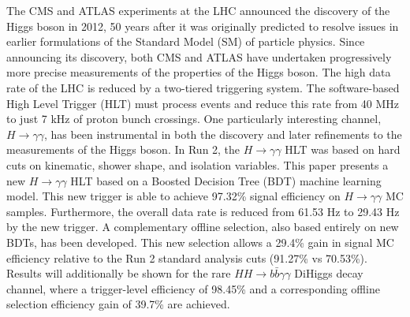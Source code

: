 \documentclass[12pt]{ucsddissertation}
\begin{document}
\begin{dissertationabstract}
	The CMS and ATLAS experiments at the LHC announced the discovery of the Higgs boson in 2012, 50 years after it was originally predicted to resolve issues in earlier formulations of the  Standard Model (SM) of particle physics. Since announcing its discovery, both CMS and ATLAS have undertaken progressively more precise measurements of the properties of the Higgs boson. The high data rate of the LHC is reduced by a two-tiered triggering system.  The software-based High Level Trigger (HLT) must process events and reduce this rate from 40 MHz to just 7 kHz of proton bunch crossings. One particularly interesting channel, $H \rightarrow \gamma \gamma$, has been instrumental in both the discovery and later refinements to the measurements of the Higgs boson. In Run 2, the $H \rightarrow \gamma \gamma$ HLT was based on hard cuts on kinematic, shower shape, and isolation variables. This paper presents a new $H \rightarrow \gamma \gamma$ HLT based on a Boosted Decision Tree (BDT) machine learning model. This new trigger is able to achieve 97.32\% signal efficiency on $H \rightarrow \gamma \gamma$ MC samples. Furthermore, the overall data rate is reduced from 61.53 Hz to 29.43 Hz by the new trigger.  A complementary offline selection, also based entirely on new BDTs, has been developed. This new selection allows a 29.4\% gain in signal MC efficiency relative to the Run 2 standard analysis cuts (91.27\% vs 70.53\%). Results will additionally be shown for the rare $HH \rightarrow b \bar{b} \gamma \gamma$ DiHiggs decay channel, where a trigger-level efficiency of 98.45\% and a corresponding offline selection efficiency gain of 39.7\% are achieved.
\end{dissertationabstract}

\mainmatter
\end{document}
